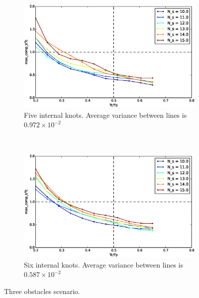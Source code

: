 \begin{figure}[!h]
        ~ %
        \begin{subfigure}[b]{0.48\textwidth}
                \includegraphics[width=\textwidth]{./images/realtime/Scenario_3__N_knots_5/mcttc-tctp.eps}
                \caption{Five internal knots. Average variance between lines is $0.972\times 10^{-2}$}\label{fig:uni35}
        \end{subfigure}
        ~ %
        \begin{subfigure}[b]{0.48\textwidth}
                \includegraphics[width=\textwidth]{./images/realtime/Scenario_3__N_knots_6/mcttc-tctp.eps}
                \caption{Six internal knots. Average variance between lines is $0.587\times 10^{-2}$}\label{fig:uni36}
        \end{subfigure}
        \caption{Three obstacles scenario.}\label{fig:uni3}
\end{figure}


